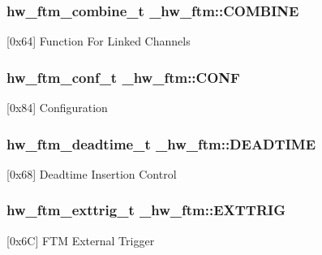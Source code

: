 \subsubsection[{\texorpdfstring{C\+O\+M\+B\+I\+NE}{COMBINE}}]{ {\bf hw\+\_\+ftm\+\_\+combine\+\_\+t} \+\_\+hw\+\_\+ftm\+::\+C\+O\+M\+B\+I\+NE}\hypertarget{struct__hw__ftm_a5166f2e8cc5c5c0607fda69ccb6d919a}{}\label{struct__hw__ftm_a5166f2e8cc5c5c0607fda69ccb6d919a}
\mbox{[}0x64\mbox{]} Function For Linked Channels 
\subsubsection[{\texorpdfstring{C\+O\+NF}{CONF}}]{ {\bf hw\+\_\+ftm\+\_\+conf\+\_\+t} \+\_\+hw\+\_\+ftm\+::\+C\+O\+NF}\hypertarget{struct__hw__ftm_a9b399fd739d73a9ea04ab828af71f34e}{}\label{struct__hw__ftm_a9b399fd739d73a9ea04ab828af71f34e}
\mbox{[}0x84\mbox{]} Configuration 
\subsubsection[{\texorpdfstring{D\+E\+A\+D\+T\+I\+ME}{DEADTIME}}]{ {\bf hw\+\_\+ftm\+\_\+deadtime\+\_\+t} \+\_\+hw\+\_\+ftm\+::\+D\+E\+A\+D\+T\+I\+ME}\hypertarget{struct__hw__ftm_a531535d979a633e543a2f57ce930588d}{}\label{struct__hw__ftm_a531535d979a633e543a2f57ce930588d}
\mbox{[}0x68\mbox{]} Deadtime Insertion Control 
\subsubsection[{\texorpdfstring{E\+X\+T\+T\+R\+IG}{EXTTRIG}}]{ {\bf hw\+\_\+ftm\+\_\+exttrig\+\_\+t} \+\_\+hw\+\_\+ftm\+::\+E\+X\+T\+T\+R\+IG}\hypertarget{struct__hw__ftm_a248fe6d02ff58a5700c9242c3bbdf762}{}\label{struct__hw__ftm_a248fe6d02ff58a5700c9242c3bbdf762}
\mbox{[}0x6C\mbox{]} F\+TM External Trigger 
